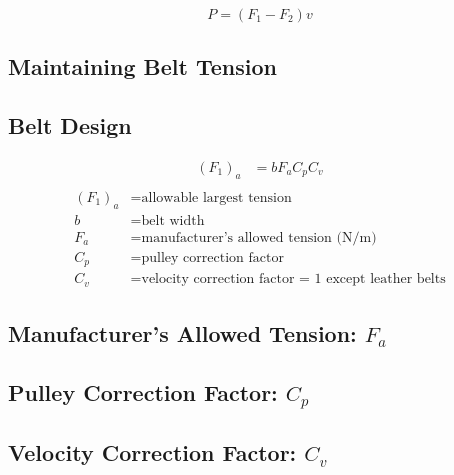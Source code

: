 \documentclass[
10pt,
a4paper,
openany,
svgnames,
]{book}
\begin{document}
$$ P = (F_1 - F_2) v $$

\subsection*{Maintaining Belt Tension}
\label{sec:org090a2cf}

\subsection*{Belt Design}
\label{sec:org12b5d77}

\begin{align*}
    (F_1)_a &= b F_a C_p C_v \\
\end{align*}
\begin{align*}
    \left( F_1 \right)_a &= \text{allowable largest tension} \\
    b &= \text{belt width} \\
    F_a &= \text{manufacturer's allowed tension (N/m)} \\
    C_p &= \text{pulley correction factor} \\
    C_v &= \text{velocity correction factor = 1 except leather belts}
\end{align*}

\subsection*{Manufacturer's Allowed Tension: \(F_a\)}
\label{sec:orgd42fdb5}

\begin{center}
\end{center}

\subsection*{Pulley Correction Factor: \(C_p\)}
\label{sec:org410b658}

\begin{center}
\end{center}

\subsection*{Velocity Correction Factor: \(C_v\)}
\label{sec:orga32a5fe}

\begin{center}
\end{center}
\end{document}
